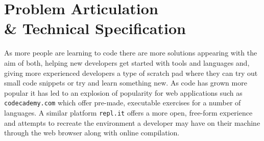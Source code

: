 \chapter{Problem Articulation\\ \& Technical Specification} \label{chapter:probart}
As more people are learning to code there are more solutions appearing with the aim of both, helping new developers get started with tools and languages and, giving more experienced developers a type of scratch pad where they can try out small code snippets or try and learn something new. As code has grown more popular it has led to an explosion of popularity for web applications such as \texttt{codecademy.com} which offer pre-made, executable exercises for a number of languages. A similar platform \texttt{repl.it} offers a more open, free-form experience and attempts to recreate the environment a developer may have on their machine through the web browser along with online compilation.

